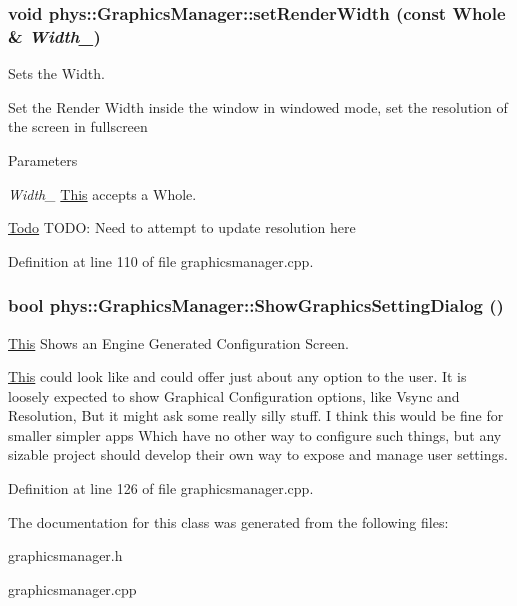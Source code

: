 \hypertarget{classphys_1_1GraphicsManager_aea5fb5808a23fa29c8522c396ac0d6b5}{
\subsubsection[{setRenderWidth}]{\setlength{\rightskip}{0pt plus 5cm}void phys::GraphicsManager::setRenderWidth (const {\bf Whole} \& {\em Width\_\-})}}
\label{dd/d63/classphys_1_1GraphicsManager_aea5fb5808a23fa29c8522c396ac0d6b5}


Sets the Width. 

Set the Render Width inside the window in windowed mode, set the resolution of the screen in fullscreen 
\begin{DoxyParams}{Parameters}
\item[{\em Width\_\-}]\hyperlink{structThis}{This} accepts a Whole. \end{DoxyParams}


\begin{Desc}
\item[\hyperlink{todo__todo000012}{Todo}]TODO: Need to attempt to update resolution here \end{Desc}




Definition at line 110 of file graphicsmanager.cpp.

\hypertarget{classphys_1_1GraphicsManager_adcded385b6442aa5da6097f1edd5471a}{
\subsubsection[{ShowGraphicsSettingDialog}]{\setlength{\rightskip}{0pt plus 5cm}bool phys::GraphicsManager::ShowGraphicsSettingDialog ()}}
\label{dd/d63/classphys_1_1GraphicsManager_adcded385b6442aa5da6097f1edd5471a}


\hyperlink{structThis}{This} Shows an Engine Generated Configuration Screen. 

\hyperlink{structThis}{This} could look like and could offer just about any option to the user. It is loosely expected to show Graphical Configuration options, like Vsync and Resolution, But it might ask some really silly stuff. I think this would be fine for smaller simpler apps Which have no other way to configure such things, but any sizable project should develop their own way to expose and manage user settings. 

Definition at line 126 of file graphicsmanager.cpp.



The documentation for this class was generated from the following files:\begin{DoxyCompactItemize}
\item 
graphicsmanager.h\item 
graphicsmanager.cpp\end{DoxyCompactItemize}
